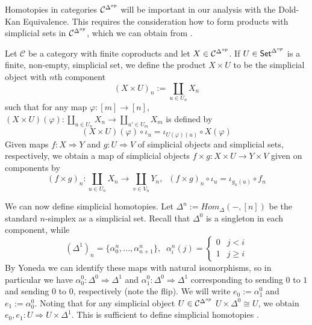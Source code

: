Homotopies in categories $\mathcal{C}^{\Delta^{op}}$ will be important in our analysis with the Dold-Kan Equivalence. This requires the consideration how to form products with simplicial sets in $\mathcal{C}^{\Delta^{op}}$, which we can obtain from \cite[Defn 14.13.1]{StacksProject}.

\begin{defn}
    Let $\mathcal{C}$ be a category with finite coproducts and let $X \in \mathcal{C}^{\Delta^{op}}$. If $U \in \textup{\textsf{Set}}^{\Delta^{op}}$ is a finite, non-empty, simplicial set, we define the product $X \times U$ to be the simplicial object with $n$th component
    \begin{equation*}
        (X\times U)_n := \coprod_{u \in U_n}X_n
    \end{equation*}
    such that for any map $\varphi:[m]\rightarrow [n]$, $(X\times U)(\varphi):\coprod_{u \in U_n}X_n\rightarrow \coprod_{u' \in U_m}X_m$ is defined by
    \begin{equation*}
        (X\times U)(\varphi)\circ \iota_u = \iota_{U(\varphi)(u)}\circ X(\varphi)
    \end{equation*}
    Given maps $f:X\Rightarrow Y$ and $g:U\Rightarrow V$ of simplicial objects and simplicial sets, respectively, we obtain a map of simplicial objects $f\times g:X\times U\rightarrow Y\times V$ given on components by 
    \begin{equation*}
        (f\times g)_n : \coprod_{u \in U_n}X_n\rightarrow \coprod_{v \in V_n}Y_n,\;\; (f\times g)_n\circ \iota_u = \iota_{g_n(u)}\circ f_n
    \end{equation*}
\end{defn}

We can now define simplicial homotopies. Let $\Delta^n := Hom_{\Delta}(-,[n])$ be the standard $n$-simplex as a simplicial set. Recall that $\Delta^0$ is a singleton in each component, while 
\begin{equation*}
    (\Delta^1)_n = \{\alpha_0^n,...,\alpha_{n+1}^n\},\;\;\alpha_i^n(j) = \left\{\begin{array}{cc} 0 & j < i \\ 1 & j \geq i \end{array}\right.
\end{equation*}
By Yoneda we can identify these maps with natural isomorphisms, so in particular we have $\alpha_0^0:\Delta^0\Rightarrow \Delta^1$ and $\alpha_1^0:\Delta^0\Rightarrow \Delta^1$ corresponding to sending $0$ to $1$ and sending $0$ to $0$, respectively (note the flip). We will write $e_0 := \alpha_1^0$ and $e_1 := \alpha_0^0$. Noting that for any simplicial object $U \in \mathcal{C}^{\Delta^{op}}$ $U\times \Delta^0 \cong U$, we obtain $e_0,e_1:U\Rightarrow U\times \Delta^1$. This is sufficient to define simplicial homotopies \cite[Defn 14.26.1]{StacksProject}.

